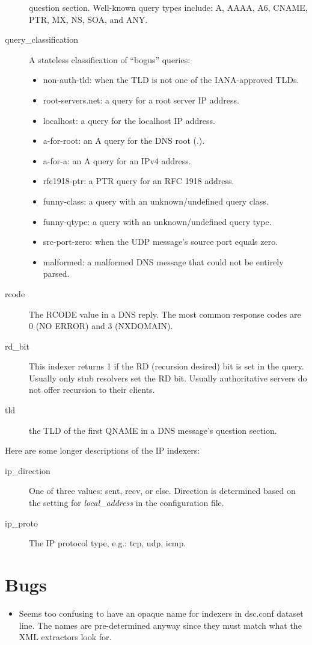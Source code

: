 \documentclass{report}
\begin{document}
\begin{description}
	question section.  Well-known query types include: A, AAAA,
	A6, CNAME, PTR, MX, NS, SOA, and ANY.
\item[query\_classification]
	A stateless classification of ``bogus'' queries:
	\begin{itemize}
	\item non-auth-tld: when the TLD is not one of the IANA-approved TLDs.
	\item root-servers.net: a query for a root server IP address.
	\item localhost: a query for the localhost IP address.
	\item a-for-root: an A query for the DNS root (.).
	\item a-for-a: an A query for an IPv4 address.
	\item rfc1918-ptr: a PTR query for an RFC 1918 address.
	\item funny-class: a query with an unknown/undefined query class.
	\item funny-qtype: a query with an unknown/undefined query type.
	\item src-port-zero: when the UDP message's source port equals zero.
	\item malformed: a malformed DNS message that could not be entirely parsed.
	\end{itemize}
\item[rcode]
	The RCODE value in a DNS reply.  The most common response
	codes are 0 (NO ERROR) and 3 (NXDOMAIN). 
\item[rd\_bit]
	This indexer returns 1 if the RD (recursion desired) bit is
	set in the query.  Usually only stub resolvers set the RD bit.
	Usually authoritative servers do not offer recursion to their
	clients.
\item[tld]
	the TLD of the first QNAME in a DNS message's question section.
\end{description}

\noindent
Here are some longer descriptions of the IP indexers:

\begin{description}
\item[ip\_direction]
	One of three values: sent, recv, or else.  Direction is determined
	based on the setting for {\em local\_address\/} in the configuration file.
\item[ip\_proto]
	The IP protocol type, e.g.: tcp, udp, icmp.
\end{description}
\chapter{Bugs}

\begin{itemize}

\item
	Seems too confusing to have an opaque name for indexers in dsc.conf dataset
	line.  The names are pre-determined anyway since they must match what the
	XML extractors look for.

\end{itemize}
\end{document}
